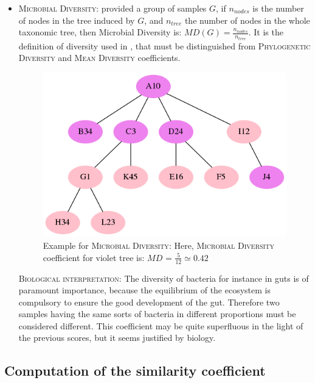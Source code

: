 \documentclass{report}
\begin{document}
\begin{itemize}
\item \textsc{Microbial Diversity:} provided a group of samples $G$, if $n_{nodes}$ is the number of nodes in the tree induced by $G$, and $n_{tree}$ the number of nodes in the whole taxonomic tree, then Microbial Diversity is: $MD(G) = \frac{n_{nodes}}{n_{tree}}$. It is the definition of diversity used in \cite{Enaud}, that must be distinguished from \textsc{Phylogenetic Diversity} \cite{PhyloD} and \textsc{Mean Diversity} \cite{MeanD} coefficients.

\begin{figure}[H]
\centering
\includegraphics[scale=0.5]{illustrations/diversity.png}
\caption{Example for \textsc{Microbial Diversity}: Here, \textsc{Microbial Diversity} coefficient for violet tree is: $MD$ = $\frac{5}{12} \simeq 0.42$}
\end{figure}

\bigskip

\textsc{Biological interpretation:} The diversity of bacteria for instance in guts is of paramount importance, because the equilibrium of the ecosystem is compulsory to ensure the good development of the gut. Therefore two samples having the same sorts of bacteria in different proportions must be considered different. This coefficient may be quite superfluous in the light of the previous scores, but it seems justified by biology.

\end{itemize}

\subsection{Computation of the similarity coefficient}
\end{document}
